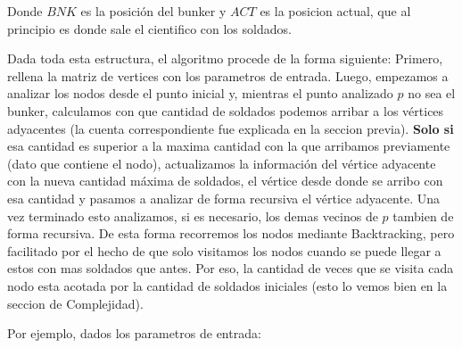 \medskip


\begin{centering}

\newarray\data
{}%


\end{centering}


\medskip

Donde $BNK$ es la posición del bunker y $ACT$ es la posicion actual, que al principio es donde sale el cientifico con los soldados.

\medskip

Dada toda esta estructura, el algoritmo procede de la forma siguiente: 
Primero, rellena la matriz de vertices con los parametros de entrada. Luego, empezamos a analizar los nodos desde el punto inicial y, mientras el punto analizado $p$ no sea el bunker, calculamos con que cantidad de soldados podemos arribar a los vértices adyacentes (la cuenta correspondiente fue explicada en la seccion previa). \textbf{Solo si} esa cantidad es superior a la maxima cantidad con la que arribamos previamente (dato que contiene el nodo), actualizamos la información del vértice adyacente con la nueva cantidad máxima de soldados, el vértice desde donde se arribo con esa cantidad y pasamos a analizar de forma recursiva el vértice adyacente. Una vez terminado esto analizamos, si es necesario, los demas vecinos de $p$ tambien de forma recursiva. De esta forma recorremos los nodos mediante Backtracking, pero facilitado por el hecho de que solo visitamos los nodos cuando se puede llegar a estos con mas soldados que antes. Por eso, la cantidad de veces que se visita cada nodo esta acotada por la cantidad de soldados iniciales (esto lo vemos bien en la seccion de Complejidad).

\medskip

Por ejemplo, dados los parametros de entrada:

